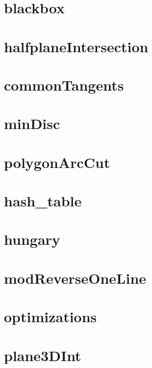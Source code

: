 \documentclass[portrait,twocolumn,letterpaper]{article}
\begin{document}
\section{blackbox}


\section{halfplaneIntersection}


\section{commonTangents}


\section{minDisc}


\section{polygonArcCut}


\section{hash\_table}


\section{hungary}


\section{modReverseOneLine}


\section{optimizations}


\section{plane3DInt}

\end{document}
